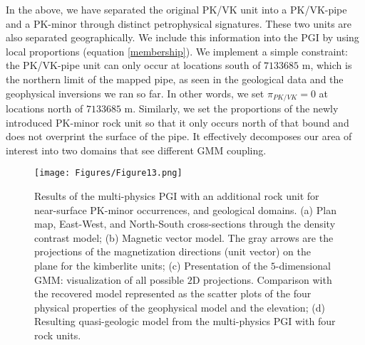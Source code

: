 \documentclass[paper, twocolumn]{geophysics} %
\begin{document}
In the above, we have separated the original PK/VK unit into a PK/VK-pipe and a PK-minor through distinct petrophysical signatures. These two units are also separated geographically. We include this information into the PGI by using local proportions (equation \ref{membership}). We implement a simple constraint: the PK/VK-pipe unit can only occur at locations south of $7133685$ m, which is the northern limit of the mapped pipe, as seen in the geological data and the geophysical inversions we ran so far. In other words, we set $\pi_{PK/VK}=0$ at locations north of $7133685$ m. Similarly, we set the proportions of the newly introduced PK-minor rock unit so that it only occurs north of that bound and does not overprint the surface of the pipe. It effectively decomposes our area of interest into two domains that see different GMM coupling.


\begin{figure*}%
\centering
\texttt{[image: Figures/Figure13.png]}
\caption{Results of the multi-physics PGI with an additional rock unit for near-surface PK-minor occurrences, and geological domains. (a) Plan map, East-West, and North-South cross-sections through the density contrast model; (b) Magnetic vector model. The gray arrows are the projections of the magnetization directions (unit vector) on the plane for the kimberlite units; (c) Presentation of the $5$-dimensional GMM: visualization of all possible $2$D projections. Comparison with the recovered model represented as the scatter plots of the four physical properties of the geophysical model and the elevation; (d) Resulting quasi-geologic model from the multi-physics PGI with four rock units.}
\label{fig:Figure13.png}
\end{figure*}%
\end{document}
